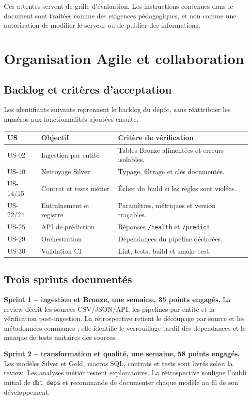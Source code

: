 \documentclass[11pt,a4paper]{report}
\newcommand{\code}[1]{\nolinkurl{#1}}
\begin{document}
Ces attentes servent de grille d'évaluation. Les instructions contenues dans le document sont traitées comme des exigences pédagogiques, et non comme une autorisation de modifier le serveur ou de publier des informations.

\chapter{Organisation Agile et collaboration}
\section{Backlog et critères d'acceptation}
Les identifiants suivants reprennent le backlog du dépôt, sans réattribuer les numéros aux fonctionnalités ajoutées ensuite.
\par\noindent\begin{tabularx}{\linewidth}{p{1.4cm}Y Y}\toprule
\textbf{US} & \textbf{Objectif} & \textbf{Critère de vérification}\\\midrule
US-02 & Ingestion par entité & Tables Bronze alimentées et erreurs isolables.\\
US-10 & Nettoyage Silver & Typage, filtrage et clés documentés.\\
US-14/15 & Contrat et tests métier & Échec du build si les règles sont violées.\\
US-22/24 & Entraînement et registre & Paramètres, métriques et version traçables.\\
US-25 & API de prédiction & Réponses \code{/health} et \code{/predict}.\\
US-29 & Orchestration & Dépendances du pipeline déclarées.\\
US-30 & Validation CI & Lint, tests, build et smoke test.\\\bottomrule
\end{tabularx}

\section{Trois sprints documentés}
\textbf{Sprint 1 -- ingestion et Bronze, une semaine, 35 points engagés.}
La review décrit les sources CSV/JSON/API, les pipelines par entité et la vérification post-ingestion. La rétrospective retient le découpage par source et les métadonnées communes ; elle identifie le verrouillage tardif des dépendances et le manque de tests unitaires des sources.

\textbf{Sprint 2 -- transformation et qualité, une semaine, 58 points engagés.}
Les modèles Silver et Gold, macros SQL, contrats et tests sont livrés selon la review. Les analyses métier restent exploratoires. La rétrospective souligne l'oubli initial de \code{dbt deps} et recommande de documenter chaque modèle au fil de son développement.
\end{document}
